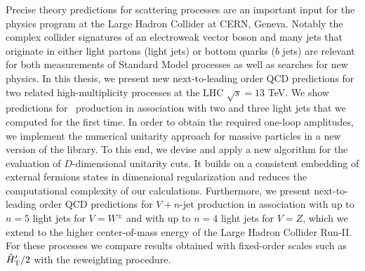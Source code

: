 Precise theory predictions for scattering processes are an important input for the physics program at the Large Hadron Collider at CERN, Geneva.
Notably the complex collider signatures of an electroweak vector boson and many jets that originate in either light partons (light jets) or
bottom quarks ($b$ jets) are relevant for both measurements of Standard Model processes as well as searches for new
physics. In this thesis, we present new next-to-leading order QCD predictions for
two related high-multiplicity processes at the LHC $\sqrt{s} =
13$ TeV. We show predictions for \Wbb~production in association with two and three light jets that
we computed for the first time. In order to obtain the required one-loop
amplitudes, we implement the numerical unitarity approach for massive
particles in a new version of the \BlackHat{} library. To this end, we devise and apply a new algorithm for the evaluation of
$D$-dimensional unitarity cuts. It builds on a consistent embedding of external fermions states in dimensional regularization and reduces the computational complexity of our calculations. Furthermore, we
present next-to-leading order QCD predictions for $V+n$-jet production in association
with up to $n=5$ light jets for $V=W^\pm$ and with up to $n=4$ light jets for
$V=Z$, which we extend to the higher
center-of-mass energy of the Large Hadron Collider Run-II. For these processes we compare results obtained with fixed-order
scales such as ${\hat H}_{\mathrm T}'/2$ with the \MINLO{} reweighting procedure.
